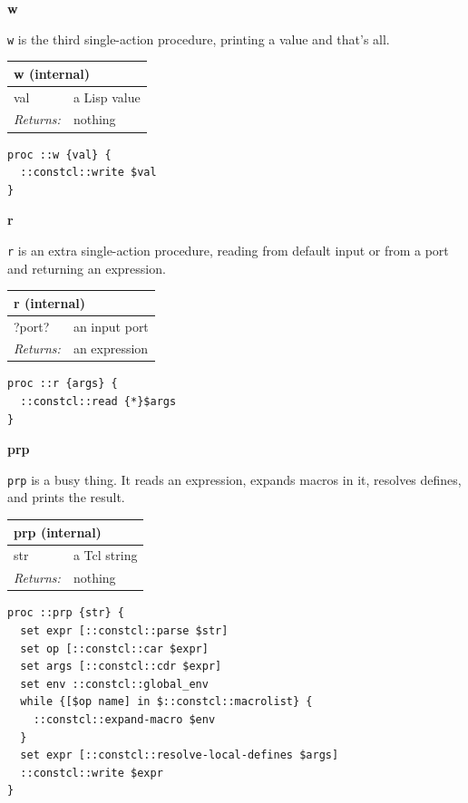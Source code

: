 \documentclass[twoside,9pt]{report}
\begin{document}
\textbf{w}


\texttt{w} is the third single-action procedure, printing a value and that's all.

\begin{tabular}{ |l l| }
\hline
\multicolumn{2}{|l|}{w (internal)} \\
\hline
val & a Lisp value \\
\textit{Returns:} & nothing \\
\hline
\end{tabular}

\noindent\makebox[\linewidth]{\rule{\linewidth}{0.4pt}}
\begin{lstlisting}
proc ::w {val} {
  ::constcl::write $val
}
\end{lstlisting}
\noindent\makebox[\linewidth]{\rule{\linewidth}{0.4pt}}

\textbf{r}


\texttt{r} is an extra single-action procedure, reading from default input or from a port and returning an expression.

\begin{tabular}{ |l l| }
\hline
\multicolumn{2}{|l|}{r (internal)} \\
\hline
?port? & an input port \\
\textit{Returns:} & an expression \\
\hline
\end{tabular}

\noindent\makebox[\linewidth]{\rule{\linewidth}{0.4pt}}
\begin{lstlisting}
proc ::r {args} {
  ::constcl::read {*}$args
}
\end{lstlisting}
\noindent\makebox[\linewidth]{\rule{\linewidth}{0.4pt}}

\textbf{prp}


\texttt{prp} is a busy thing. It reads an expression, expands macros in it, resolves defines, and prints the result.

\begin{tabular}{ |l l| }
\hline
\multicolumn{2}{|l|}{prp (internal)} \\
\hline
str & a Tcl string \\
\textit{Returns:} & nothing \\
\hline
\end{tabular}

\noindent\makebox[\linewidth]{\rule{\linewidth}{0.4pt}}
\begin{lstlisting}
proc ::prp {str} {
  set expr [::constcl::parse $str]
  set op [::constcl::car $expr]
  set args [::constcl::cdr $expr]
  set env ::constcl::global_env
  while {[$op name] in $::constcl::macrolist} {
    ::constcl::expand-macro $env
  }
  set expr [::constcl::resolve-local-defines $args]
  ::constcl::write $expr
}
\end{lstlisting}
\noindent\makebox[\linewidth]{\rule{\linewidth}{0.4pt}}
\end{document}
